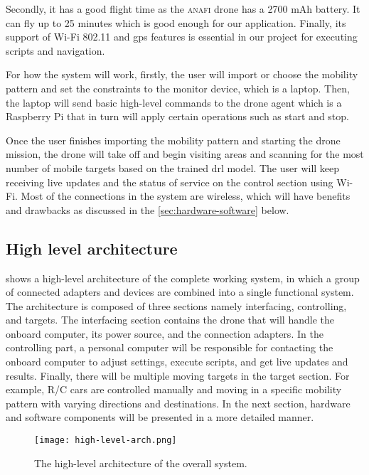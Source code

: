 \documentclass[../main.tex]{subfiles}
\begin{document}
Secondly, it has a good flight time 
as the \textsc{anafi} drone has a 2700 mAh battery. 
It can fly up to 25 minutes which is good enough 
for our application.
Finally, its support of Wi-Fi 802.11 and \gls{gps} 
features is essential in our project for 
executing scripts and navigation. 

For how the system will work, firstly, the user 
will import or choose the mobility pattern and set
the constraints to the monitor device,
which is a laptop. Then, the laptop will send basic
high-level commands to the drone agent which is a
Raspberry Pi that in turn will apply certain
operations such as start and stop.

Once the user finishes importing the mobility pattern
and starting the drone mission, the drone will
take off and begin visiting areas and scanning for
the most number of mobile targets based on the
trained \gls{drl} model.
The user will keep receiving live updates and the
status of service on the control section using Wi-Fi.
Most of the connections in the system are wireless,
which will have benefits and drawbacks as discussed
in the \cref{sec:hardware-software} below.

\subsection{High level architecture}

 shows a high-level architecture 
of the complete working system, in which a group 
of connected adapters and devices are combined into 
a single functional system. 
The architecture is composed of three sections namely
interfacing, controlling, and targets. 
The interfacing section contains the drone that 
will handle the onboard computer, its power source, 
and the connection adapters. 
In the controlling part, a personal computer 
will be responsible for contacting the onboard computer 
to adjust settings, execute scripts, and get 
live updates and results. 
Finally, there will be multiple moving targets 
in the target section. For example, 
R/C cars are controlled manually and moving in 
a specific mobility pattern with varying directions 
and destinations. 
In the next section, hardware and software components 
will be presented in a more detailed manner.

\begin{figure}[H]
    \centering
    \texttt{[image: high-level-arch.png]}
    \caption{The high-level architecture of the overall system.}
    \label{fig:arch-fig}
\end{figure}
\end{document}
